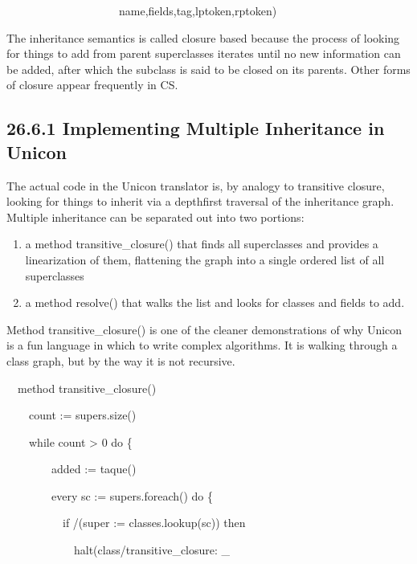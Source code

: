 {\ttfamily\mdseries
\ \ \ \ \ \ \ \ \ \ \ \ \ \ \ \ \ \ \ \ name,fields,tag,lptoken,rptoken)}

The inheritance semantics is called {\textquotedbl}closure
based{\textquotedbl} because the process of looking for things to add
from parent superclasses iterates until no new information can be
added, after which the subclass is said to be closed on its
parents. Other forms of closure appear frequently in CS.

\subsection[26.6.1 Implementing Multiple Inheritance in Unicon]{26.6.1 Implementing Multiple Inheritance in Unicon}

The actual code in the Unicon translator is, by analogy to transitive
closure, looking for things to inherit via a depthfirst traversal of
the inheritance graph. Multiple inheritance can be separated out into
two portions:

\liststyleLxliii
\begin{enumerate}

\item a method transitive\_closure() that finds all superclasses and
provides a linearization of them, flattening the graph into a single
ordered list of all superclasses

\item a method resolve() that walks the list and looks for classes and
fields to add.

\end{enumerate}

Method transitive\_closure() is one of the cleaner demonstrations of
why Unicon is a fun language in which to write complex algorithms. It
is walking through a class graph, but by the way it is not recursive.

{\ttfamily\mdseries
\ \ method transitive\_closure()}

{\ttfamily\mdseries
\ \ \ \ count := supers.size()}

{\ttfamily\mdseries
\ \ \ \ while count {\textgreater} 0 do \{}

{\ttfamily\mdseries
\ \ \ \ \ \ \ \ added := taque()}

{\ttfamily\mdseries
\ \ \ \ \ \ \ \ every sc := supers.foreach() do \{}

{\ttfamily\mdseries
\ \ \ \ \ \ \ \ \ \ if /(super := classes.lookup(sc)) then}

{\ttfamily\mdseries
\ \ \ \ \ \ \ \ \ \ \ \ halt({\textquotedbl}class/transitive\_closure: \_}

